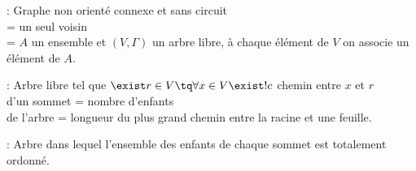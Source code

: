  : Graphe non orienté connexe et sans circuit \\
 = un seul voisin \\
 = $A$ un ensemble et $(V,\Gamma)$ un arbre libre, à chaque élément de $V$ on associe un élément de $A$. \\

\par

 : Arbre libre tel que $\exist r\in V \tq \forall x \in V \exist! c$ chemin entre $x$ et $r$ \\ 
 d'un sommet = nombre d'enfants \\
 de l'arbre = longueur du plus grand chemin entre la racine et une feuille. \\

\par

 : Arbre dans lequel l'ensemble des enfants de chaque sommet est totalement ordonné. 
